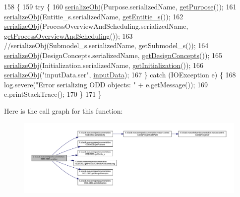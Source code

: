\begin{DoxyCode}
158                                   \{
159         \textcolor{keywordflow}{try} \{
160             \hyperlink{classit_1_1isislab_1_1masonhelperdocumentation_1_1_o_d_d_1_1_o_d_d_a75c591cb9280595f4f3a3201dea04645}{serializeObj}(Purpose.serializedName, \hyperlink{classit_1_1isislab_1_1masonhelperdocumentation_1_1_o_d_d_1_1_o_d_d_aa537a775bb22e03b1a0b1a407a4fbd06}{getPurpose}());
161             \hyperlink{classit_1_1isislab_1_1masonhelperdocumentation_1_1_o_d_d_1_1_o_d_d_a75c591cb9280595f4f3a3201dea04645}{serializeObj}(Entitie\_s.serializedName, \hyperlink{classit_1_1isislab_1_1masonhelperdocumentation_1_1_o_d_d_1_1_o_d_d_a42a9a6f8615c70c73034e5c23dd8eb0f}{getEntitie\_s}());
162             \hyperlink{classit_1_1isislab_1_1masonhelperdocumentation_1_1_o_d_d_1_1_o_d_d_a75c591cb9280595f4f3a3201dea04645}{serializeObj}(ProcessOverviewAndScheduling.serializedName, 
      \hyperlink{classit_1_1isislab_1_1masonhelperdocumentation_1_1_o_d_d_1_1_o_d_d_a4d34153928ab00d1226f5634997ac74a}{getProcessOverviewAndScheduling}());
163             \textcolor{comment}{//serializeObj(Submodel\_s.serializedName, getSubmodel\_s());}
164             \hyperlink{classit_1_1isislab_1_1masonhelperdocumentation_1_1_o_d_d_1_1_o_d_d_a75c591cb9280595f4f3a3201dea04645}{serializeObj}(DesignConcepts.serializedName, 
      \hyperlink{classit_1_1isislab_1_1masonhelperdocumentation_1_1_o_d_d_1_1_o_d_d_a4177c47f02357b7b48d03c88571f26e1}{getDesignConcepts}());
165             \hyperlink{classit_1_1isislab_1_1masonhelperdocumentation_1_1_o_d_d_1_1_o_d_d_a75c591cb9280595f4f3a3201dea04645}{serializeObj}(Initialization.serializedName, 
      \hyperlink{classit_1_1isislab_1_1masonhelperdocumentation_1_1_o_d_d_1_1_o_d_d_a2d557024511c26262b62b70f540ea37e}{getInitialization}());
166             \hyperlink{classit_1_1isislab_1_1masonhelperdocumentation_1_1_o_d_d_1_1_o_d_d_a75c591cb9280595f4f3a3201dea04645}{serializeObj}(\textcolor{stringliteral}{"inputData.ser"}, \hyperlink{classit_1_1isislab_1_1masonhelperdocumentation_1_1_o_d_d_1_1_o_d_d_a003e2cc245212d81de91896a8ce4f440}{inputData});
167         \} \textcolor{keywordflow}{catch} (IOException e) \{
168             log.severe(\textcolor{stringliteral}{"Error serializing ODD objects: "} + e.getMessage());
169             e.printStackTrace();
170         \}
171     \}
\end{DoxyCode}


Here is the call graph for this function\-:
\nopagebreak
\begin{figure}[H]
\begin{center}
\leavevmode
\includegraphics[width=350pt]{classit_1_1isislab_1_1masonhelperdocumentation_1_1_o_d_d_1_1_o_d_d_aff5e4d3b97260b59285382208c905f68_cgraph}
\end{center}
\end{figure}


